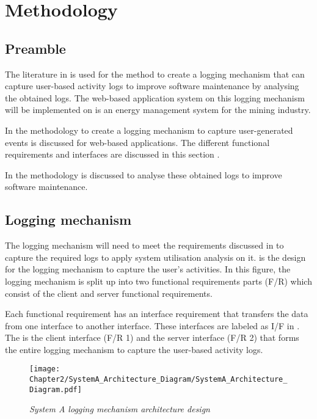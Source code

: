 \chapter{Methodology}
\label{chap:2}

\section{Preamble} The literature in  is used for the method to create a logging mechanism that can capture user-based activity logs to improve software maintenance by analysing the obtained logs. The web-based application system on this logging mechanism will be implemented on is an energy management system for the mining industry.\par In  the methodology to create a logging mechanism to capture user-generated events is discussed for web-based applications. The different functional requirements and interfaces are discussed in this section \cite{Anish2015}.\par In  the methodology is discussed to analyse these obtained logs to improve software maintenance.

\section{Logging mechanism}\label{Ch2:LoggingMechanism} The logging mechanism will need to meet the requirements discussed in  to capture the required logs to apply system utilisation analysis on it.  is the design for the logging mechanism to capture the user's activities. In this figure, the logging mechanism is split up into two functional requirements parts (F/R) which consist of the client and server functional requirements.\par Each functional requirement has an interface requirement that transfers the data from one interface to another interface. These interfaces are labeled as I/F in . The  is the client interface (F/R 1) and the server interface (F/R 2) that forms the entire logging mechanism to capture the user-based activity logs.

\begin{figure}[!htb] %
	\centering %
	\texttt{[image: Chapter2/SystemA\_Architecture\_Diagram/SystemA\_Architecture\_Diagram.pdf]}
	\caption[System A logging mechanism architecture design]
	{\textit{System A logging mechanism architecture design}}\label{fig:CH2_SystemA_Arch_Design}
\end{figure}

